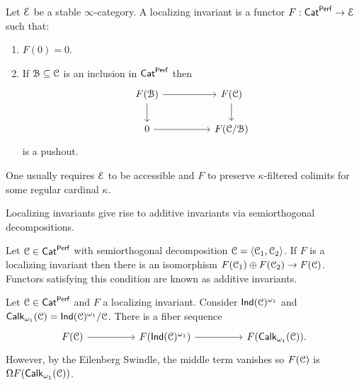 \begin{definition}\label{def: localizing invariant}
    Let $\EuScript{E}$ be a stable $\infty$-category. A localizing invariant is a functor $F:\mathsf{Cat}^{\mathsf{Perf}}\to\EuScript{E}$ such that:
    \begin{enumerate}[label=(\roman*)]
        \item $F(0)=0$.
        \item If $\EuScript{B}\subseteq\EuScript{C}$ is an inclusion in $\mathsf{Cat}^{\mathsf{Perf}}$ then 
        $$%
        \begin{tikzcd}
            {F(\Bscr)} && {F(\Cscr)} \\
            0 && {F(\Cscr/\Bscr)}
            \arrow[from=1-1, to=1-3]
            \arrow[from=1-1, to=2-1]
            \arrow[from=1-3, to=2-3]
            \arrow[from=2-1, to=2-3]
        \end{tikzcd}$$
        is a pushout. 
    \end{enumerate}
\end{definition}
\begin{remark}
    One usually requires $\EuScript{E}$ to be accessible and $F$ to preserve $\kappa$-filtered colimits for some regular cardinal $\kappa$. 
\end{remark}
Localizing invariants give rise to additive invariants via semiorthogonal decompositions. 
\begin{example}
   Let $\EuScript{C}\in\mathsf{Cat}^{\mathsf{Perf}}$ with semiorthogonal decomposition $\EuScript{C}=\langle\EuScript{C}_{1},\EuScript{C}_{2}\rangle$. If $F$ is a localizing invariant then there is an isomorphism $F(\EuScript{C}_{1})\oplus F(\EuScript{C}_{2})\to F(\EuScript{C})$. Functors satisfying this condition are known as additive invariants. 
\end{example}
\begin{example}
    Let $\EuScript{C}\in\mathsf{Cat}^{\mathsf{Perf}}$ and $F$ a localizing invariant. Consider $\mathsf{Ind}(\EuScript{C})^{\omega_{1}}$ and $\mathsf{Calk}_{\omega_{1}}(\EuScript{C})=\mathsf{Ind}(\EuScript{C})^{\omega_{1}}/\EuScript{C}$. There is a fiber sequence 
    $$%
    \begin{tikzcd}
        {F(\Cscr)} && {F(\Ind(\Cscr)^{\omega_{1}})} && {F(\Calk_{\omega_{1}}(\Cscr)).}
        \arrow[from=1-1, to=1-3]
        \arrow[from=1-3, to=1-5]
    \end{tikzcd}$$
    However, by the Eilenberg Swindle, the middle term vanishes so $F(\EuScript{C})$ is $\Omega F(\mathsf{Calk}_{\omega_{1}}(\EuScript{C}))$.
\end{example}
